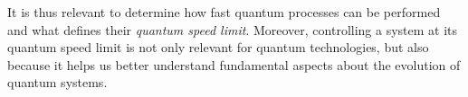 \documentclass[aps,pra,reprint,a4paper,nofootinbib,superscriptaddress,numbers,longbibliography,showpacs,showkeys,floatfix]{revtex4-1}
\begin{document}
%
%
It is thus relevant to determine how fast quantum processes can be performed and what defines their \emph{quantum speed limit}.
%
%
Moreover, controlling a system at its quantum speed limit is not only relevant for quantum technologies, but also because it helps us better understand fundamental aspects about the evolution of quantum systems.
%

\end{document}
